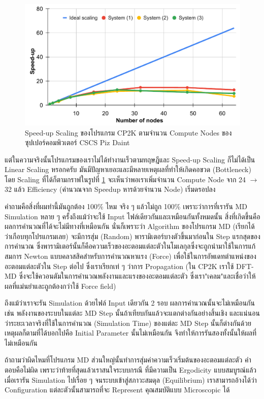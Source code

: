 \begin{figure}[htbp]
  \centering
  \includegraphics[width=0.8\linewidth]{fig/perf-scaling-cp2k.pdf}
  \caption{Speed-up Scaling ของโปรแกรม CP2K ตามจำนวน Compute Nodes ของซุปเปอร์คอมพิวเตอร์ CSCS Piz Daint}
  \label{fig:perf_scaling_cp2k}
\end{figure}

แต่ในความจริงนั้นโปรแกรมของเราไม่ได้ทำงานเร็วตามทฤษฎีและ Speed-up Scaling ก็ไม่ได้เป็น Linear Scaling หรอกครับ
มันมีปัญหาเยอะและมีหลายเหตุผลที่ทำให้เกิดคอขวด (Bottleneck) โดย Scaling ที่ได้ก็ตามกราฟในรูปที่ \ref{fig:perf_scaling_cp2k}
จะเห็นว่าพอเราเพิ่มจำนวน Compute Node จาก 24 $\rightarrow$ 32 แล้ว Efficiency (คำนวณจาก Speedup หารด้วยจำนวน Node)
เริ่มดรอปลง

คำถามคือสิ่งที่ผมทำนี้มันถูกต้อง 100\% ไหม จริง ๆ แล้วไม่ถูก 100\% เพราะว่าการที่เรารัน MD Simulation หลาย ๆ ครั้งถึงแม้ว่าจะใช้ Input
ไฟล์เดียวกันและเหมือนกันทั้งหมดนั้น สิ่งที่เกิดขึ้นคือผลการคำนวณที่ได้จะไม่มีทางที่เหมือนกัน นั่นก็เพราะว่า Algorithm ของโปรแกรม MD
(เรียกได้ว่าเกือบทุกโปรแกรมเลย) จะมีการสุ่ม (Random) พารามิเตอร์บางตัวขึ้นมาก่อนใน Step แรกสุดของการคำนวณ
ซึ่งพารามิเตอร์นั้นก็คือความเร็วของอะตอมแต่ละตัวในโมเลกุลซึ่งจะถูกนำมาใช้ในการแก้สมการ Newton แบบคลาสสิคสำหรับการคำนวณหาแรง (Force)
เพื่อใช้ในการอัพเดทตำแหน่งของอะตอมแต่ละตัวใน Step ต่อไป ซึ่งเราเรียกเท่ ๆ ว่าการ Propagation
(ใน CP2K เราใช้ DFT-MD ซึ่งจะใช้ควอนตัมในการคำนวณพลังงานและแรงของอะตอมแต่ละตัว ซึ่งเรา"เคลม"และเชื่อว่าให้ผลที่แม่นยำและถูกต้องกว่าใช้ Force field)

ถึงแม้ว่าเราจะรัน Simulation ด้วยไฟล์ Input เดียวกัน 2 รอบ ผลการคำนวณนั้นจะไม่เหมือนกัน เช่น พลังงานของระบบในแต่ละ MD Step
นั้นถ้าเทียบกันแล้วจะแตกต่างกันอย่างสิ้นเชิง และแน่นอนว่าระยะเวลาจริงที่ใช้ในการคำนวณ (Simulation Time) ของแต่ละ MD Step นั้นก็ต่างกันด้วย
เหตุผลก็ตามที่ได้บอกไปคือ Initial Parameter นั้นไม่เหมือนกัน จึงทำให้การรันสองทั้งนั้นให้ผลที่ไม่เหมือนกัน

ถ้าถามว่าผิดไหมที่โปรแกรม MD ส่วนใหญ่นั้นทำการสุ่มค่าความเร็วเริ่มต้นของอะตอมแต่ละตัว คำตอบคือไม่ผิด เพราะว่าท้ายที่สุดแล้วเราสนใจระบบกรณี%
ที่มีความเป็น Ergodicity แบบสมบูรณ์แล้ว เมื่อเรารัน Simulation ไปเรื่อย ๆ จนระบบเข้าสู่สภาวะสมดุล (Equilibrium) เราสามารถอ้างได้ว่า
Configuration แต่ละตัวนั้นสามารถที่จะ Represent คุณสมบัติแบบ Microscopic ได้

